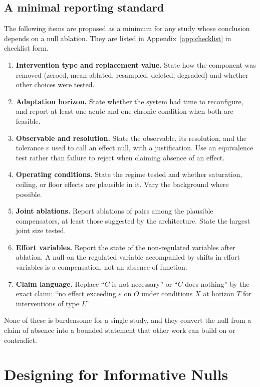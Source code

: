 \documentclass[11pt]{article}
\theoremstyle{definition}
\theoremstyle{remark}
\begin{document}
\subsection{A minimal reporting standard}

The following items are proposed as a minimum for any study whose conclusion depends on a null ablation. They are listed in Appendix~\ref{app:checklist} in checklist form.

\begin{enumerate}[label=\textbf{R\arabic*.}]
\item \textbf{Intervention type and replacement value.} State how the component was removed (zeroed, mean-ablated, resampled, deleted, degraded) and whether other choices were tested.
\item \textbf{Adaptation horizon.} State whether the system had time to reconfigure, and report at least one acute and one chronic condition when both are feasible.
\item \textbf{Observable and resolution.} State the observable, its resolution, and the tolerance $\varepsilon$ used to call an effect null, with a justification. Use an equivalence test rather than failure to reject when claiming absence of an effect.
\item \textbf{Operating conditions.} State the regime tested and whether saturation, ceiling, or floor effects are plausible in it. Vary the background where possible.
\item \textbf{Joint ablations.} Report ablations of pairs among the plausible compensators, at least those suggested by the architecture. State the largest joint size tested.
\item \textbf{Effort variables.} Report the state of the non-regulated variables after ablation. A null on the regulated variable accompanied by shifts in effort variables is a compensation, not an absence of function.
\item \textbf{Claim language.} Replace ``$C$ is not necessary'' or ``$C$ does nothing'' by the exact claim: ``no effect exceeding $\varepsilon$ on $O$ under conditions $X$ at horizon $T$ for interventions of type $I$.''
\end{enumerate}

None of these is burdensome for a single study, and they convert the null from a claim of absence into a bounded statement that other work can build on or contradict.

\section{Designing for Informative Nulls}\label{sec:design}
\end{document}
